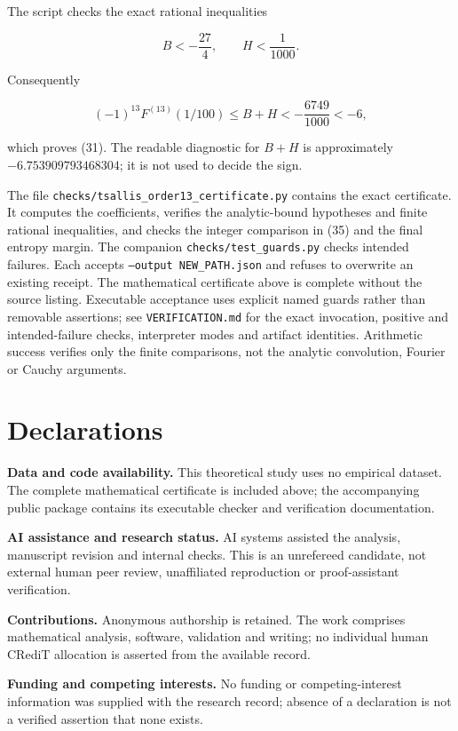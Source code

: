 \documentclass[
  11pt,
]{article}
\newcounter{none} %
\begin{document}
The script checks the exact rational inequalities

\[
B<-\frac{27}{4},\qquad H<\frac1{1000}.
\]

Consequently

\[
(-1)^{13}F^{(13)}(1/100)\leq B+H
 <-\frac{6749}{1000}<-6,
\]

which proves (31). The readable diagnostic for \(B+H\) is approximately
\(-6.753909793468304\); it is not used to decide the sign.

The file \texttt{checks/tsallis\_order13\_certificate.py} contains the
exact certificate. It computes the coefficients, verifies the
analytic-bound hypotheses and finite rational inequalities, and checks
the integer comparison in (35) and the final entropy margin.
The companion \texttt{checks/test\_guards.py} checks intended failures.
Each accepts \texttt{--output NEW\_PATH.json} and refuses to overwrite
an existing receipt.
The mathematical certificate above is complete without the source
listing. Executable acceptance uses explicit named guards rather than
removable assertions; see \texttt{VERIFICATION.md} for the exact
invocation, positive and intended-failure checks, interpreter modes and
artifact identities. Arithmetic success verifies only the finite
comparisons, not the analytic convolution, Fourier or Cauchy arguments.

\section*{Declarations}\label{declarations}

\textbf{Data and code availability.} This theoretical study uses no
empirical dataset. The complete mathematical certificate is included
above; the accompanying public package contains its executable checker
and verification documentation.

\textbf{AI assistance and research status.} AI systems assisted the
analysis, manuscript revision and internal checks. This is an unrefereed
candidate, not external human peer review, unaffiliated reproduction or
proof-assistant verification.

\textbf{Contributions.} Anonymous authorship is retained. The work
comprises mathematical analysis, software, validation and writing; no
individual human CRediT allocation is asserted from the available
record.

\textbf{Funding and competing interests.} No funding or
competing-interest information was supplied with the research record;
absence of a declaration is not a verified assertion that none exists.
\end{document}
